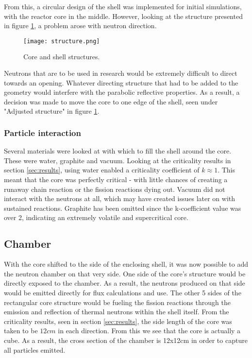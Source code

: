 From this, a circular design of the shell was implemented for initial simulations, with the reactor core in the middle. However, looking at the structure presented in figure \ref{fig:structure}, a problem arose with neutron direction.

\begin{figure}[!htbp]
\caption{Core and shell structures.}
\label{fig:structure}
\centering
\texttt{[image: structure.png]}
\end{figure}

Neutrons that are to be used in research would be extremely difficult to direct towards an opening. Whatever directing structure that had to be added to the geometry would interfere with the parabolic reflective properties. As a result, a decision was made to move the core to one edge of the shell, seen under "Adjusted structure" in figure \ref{fig:structure}.

\subsubsection{Particle interaction}

Several materials were looked at with which to fill the shell around the core. These were water, graphite and vacuum. Looking at the criticality results in section \ref{sec:results}, using water enabled a criticality coefficient of $k\approx 1$. This meant that the core was perfectly critical - with little chances of creating a runaway chain reaction or the fission reactions dying out. Vacuum did not interact with the neutrons at all, which may have created issues later on with sustained reactions. Graphite has been omitted since the k-coefficient value was over 2, indicating an extremely volatile and supercritical core.
\subsection{Chamber}

With the core shifted to the side of the enclosing shell, it was now possible to add the neutron chamber on that very side. One side of the core's structure would be directly exposed to the chamber. As a result, the neutrons produced on that side would be emitted directly for flux calculations and use. The other 5 sides of the rectangular core structure would be fueling the fission reactions through the emission and reflection of thermal neutrons within the shell itself. From the criticality results, seen in section \ref{sec:results}, the side length of the core was taken to be $12cm$ in each direction. From this we see that the core is actually a cube. As a result, the cross section of the chamber is 12x12cm in order to capture all particles emitted.

